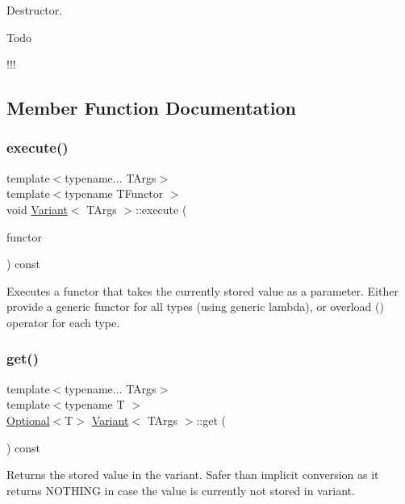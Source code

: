 Destructor. 

\begin{DoxyRefDesc}{Todo}
\item[\hyperlink{todo__todo000024}{Todo}]!!! \end{DoxyRefDesc}


\subsection{Member Function Documentation}
\hypertarget{classVariant_a7a391165290021c00fec1e01059943c7}{}\label{classVariant_a7a391165290021c00fec1e01059943c7} 
\subsubsection{\texorpdfstring{execute()}{execute()}}
{\footnotesize\ttfamily template$<$typename... T\+Args$>$ \\
template$<$typename T\+Functor $>$ \\
void \hyperlink{classVariant}{Variant}$<$ T\+Args $>$\+::execute (\begin{DoxyParamCaption}\item[{T\+Functor \&\&}]{functor }\end{DoxyParamCaption}) const\hspace{0.3cm}{\ttfamily [inline]}}

Executes a functor that takes the currently stored value as a parameter. Either provide a generic functor for all types (using generic lambda), or overload () operator for each type. \hypertarget{classVariant_a478e263679709c8fd398d2bd27a03e1f}{}\label{classVariant_a478e263679709c8fd398d2bd27a03e1f} 
\subsubsection{\texorpdfstring{get()}{get()}}
{\footnotesize\ttfamily template$<$typename... T\+Args$>$ \\
template$<$typename T $>$ \\
\hyperlink{classOptional}{Optional}$<$T$>$ \hyperlink{classVariant}{Variant}$<$ T\+Args $>$\+::get (\begin{DoxyParamCaption}{ }\end{DoxyParamCaption}) const\hspace{0.3cm}{\ttfamily [inline]}}

Returns the stored value in the variant. Safer than implicit conversion as it returns N\+O\+T\+H\+I\+NG in case the value is currently not stored in variant. \hypertarget{classVariant_a939142e02efadd71477177b6c4c67b57}{}\label{classVariant_a939142e02efadd71477177b6c4c67b57} 
